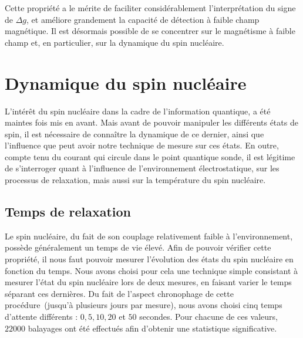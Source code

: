Cette propriété a le mérite de faciliter considérablement l'interprétation du signe de $\Delta g$, et améliore grandement la capacité de détection à faible champ magnétique. Il est désormais possible de se concentrer sur le magnétisme à faible champ et, en particulier, sur la dynamique du spin nucléaire. 

\section{Dynamique du spin nucléaire}
L’intérêt du spin nucléaire dans la cadre de l'information quantique, a été maintes fois mis en avant. Mais avant de pouvoir manipuler les différents états de spin, il est nécessaire de connaître la dynamique de ce dernier, ainsi que l'influence que peut avoir notre technique de mesure sur ces états. En outre, compte tenu du courant qui circule dans le point quantique sonde, il est légitime de s'interroger quant à l'influence de l'environnement électrostatique, sur les processus de relaxation, mais aussi sur la température du spin nucléaire. 

\subsection{Temps de relaxation}
Le spin nucléaire, du fait de son couplage relativement faible à l’environnement, possède généralement un temps de vie élevé. Afin de pouvoir vérifier cette propriété, il nous faut pouvoir mesurer l'évolution des états du spin nucléaire en fonction du temps. Nous avons choisi pour cela une technique simple consistant à mesurer l'état du spin nucléaire lors de deux mesures, en faisant varier le temps séparant ces dernières. Du fait de l'aspect chronophage de cette procédure~(jusqu'à plusieurs jours par mesure), nous avons choisi cinq temps d'attente différents : $0,5,10,20$ et $50$ secondes. Pour chacune de ces valeurs, $22000$ balayages ont été effectués afin d'obtenir une statistique significative.


